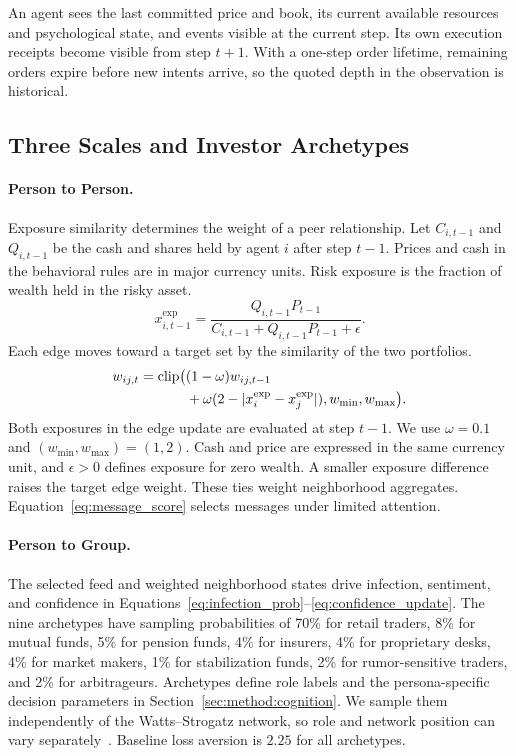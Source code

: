 An agent sees the last committed price and book, its current available resources and psychological state, and events visible at the current step. Its own execution receipts become visible from step $t+1$. With a one-step order lifetime, remaining orders expire before new intents arrive, so the quoted depth in the observation is historical.

\subsection{Three Scales and Investor Archetypes}
\label{sec:method:population}

\paragraph{Person to Person.} Exposure similarity determines the weight of a peer relationship. Let $C_{i,t-1}$ and $Q_{i,t-1}$ be the cash and shares held by agent $i$ after step $t-1$. Prices and cash in the behavioral rules are in major currency units. Risk exposure is the fraction of wealth held in the risky asset.
\begin{equation}
x^{\mathrm{exp}}_{i,t-1}=\frac{Q_{i,t-1}P_{t-1}}{C_{i,t-1}+Q_{i,t-1}P_{t-1}+\epsilon}.
  \label{eq:exposure}
\end{equation}
Each edge moves toward a target set by the similarity of the two portfolios.
\begin{equation}
\begin{split}w_{ij,t}=\operatorname{clip}\bigl(&(1-\omega)w_{ij,t-1}\\&+\omega(2-|x_i^{\rm exp}-x_j^{\rm exp}|),w_{\min},w_{\max}\bigr).\end{split}
  \label{eq:edge_weight}
\end{equation}
Both exposures in the edge update are evaluated at step $t-1$. We use $\omega=0.1$ and $(w_{\min},w_{\max})=(1,2)$. Cash and price are expressed in the same currency unit, and $\epsilon>0$ defines exposure for zero wealth. A smaller exposure difference raises the target edge weight. These ties weight neighborhood aggregates. Equation~\eqref{eq:message_score} selects messages under limited attention.

\paragraph{Person to Group.} The selected feed and weighted neighborhood states drive infection, sentiment, and confidence in Equations~\eqref{eq:infection_prob}--\eqref{eq:confidence_update}. The nine archetypes have sampling probabilities of 70\% for retail traders, 8\% for mutual funds, 5\% for pension funds, 4\% for insurers, 4\% for proprietary desks, 4\% for market makers, 1\% for stabilization funds, 2\% for rumor-sensitive traders, and 2\% for arbitrageurs. Archetypes define role labels and the persona-specific decision parameters in Section~\ref{sec:method:cognition}. We sample them independently of the Watts--Strogatz network, so role and network position can vary separately~\cite{watts1998collective}. Baseline loss aversion is $2.25$ for all archetypes.

